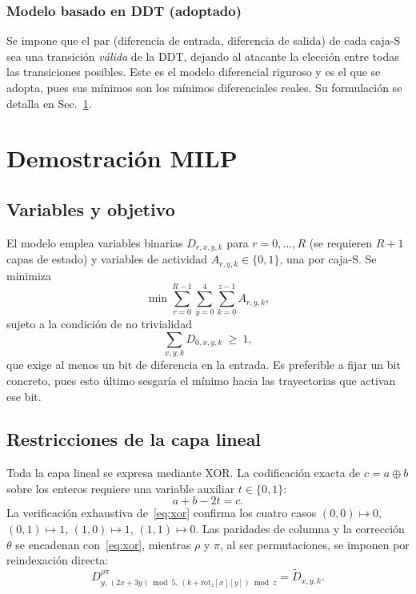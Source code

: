 \documentclass[conference]{IEEEtran}
\newcommand{\xor}{\oplus}
\begin{document}
\subsubsection{Modelo basado en DDT (adoptado)}
Se impone que el par (diferencia de entrada, diferencia de salida) de cada caja-S sea una
transición \emph{válida} de la DDT, dejando al atacante la elección entre todas las
transiciones posibles. Este es el modelo diferencial riguroso y es el que se adopta, pues
sus mínimos son los mínimos diferenciales reales. Su formulación se detalla en
Sec.~\ref{sec:milp}.

\section{Demostración MILP}\label{sec:milp}

\subsection{Variables y objetivo}

El modelo emplea variables binarias $D_{r,x,y,k}$ para $r=0,\dots,R$ (se requieren $R+1$
capas de estado) y variables de actividad $A_{r,y,k}\in\{0,1\}$, una por caja-S. Se
minimiza
\begin{equation}
\min \sum_{r=0}^{R-1}\sum_{y=0}^{4}\sum_{k=0}^{z-1} A_{r,y,k},
\end{equation}
sujeto a la condición de no trivialidad
\begin{equation}\label{eq:nonzero}
\sum_{x,y,k} D_{0,x,y,k}\ \ge\ 1,
\end{equation}
que exige al menos un bit de diferencia en la entrada. Es preferible a fijar un bit
concreto, pues esto último sesgaría el mínimo hacia las trayectorias que activan ese bit.

\subsection{Restricciones de la capa lineal}

Toda la capa lineal se expresa mediante XOR. La codificación exacta de $c=a\xor b$ sobre
los enteros requiere una variable auxiliar $t\in\{0,1\}$:
\begin{equation}\label{eq:xor}
a+b-2t=c.
\end{equation}
La verificación exhaustiva de~\eqref{eq:xor} confirma los cuatro casos
$(0,0)\!\mapsto\!0$, $(0,1)\!\mapsto\!1$, $(1,0)\!\mapsto\!1$, $(1,1)\!\mapsto\!0$. Las
paridades de columna y la corrección $\theta$ se encadenan con~\eqref{eq:xor}, mientras
$\rho$ y $\pi$, al ser permutaciones, se imponen por reindexación directa:
\begin{equation}
D^{\rho\pi}_{y,\,(2x+3y)\bmod5,\,(k+\mathrm{rot}_z[x][y])\bmod z}=\widetilde{D}_{x,y,k}.
\end{equation}
\end{document}

